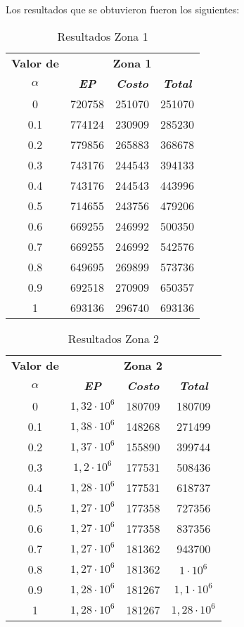 \documentclass[conference]{IEEEtran}
\begin{document}
Los resultados que se obtuvieron fueron los siguientes:
\begin{table}[H]
\caption{Resultados Zona 1}
\begin{center}
\begin{tabular}{|c|c|c|c|}
\hline
\textbf{Valor de}&\multicolumn{3}{|c|}{\textbf{Zona 1}} \\
\cline{2-4} 
\textbf{$\alpha$} & \textbf{\textit{EP}}& \textbf{\textit{Costo}}& \textbf{\textit{Total}} \\
\hline
0&720758&251070&251070\\ \hline
0.1&774124&230909&285230\\ \hline
0.2&779856&265883&368678\\ \hline
0.3&743176&244543&394133\\ \hline
0.4&743176&244543&443996\\ \hline
0.5&714655&243756&479206\\ \hline
0.6&669255&246992&500350\\ \hline
0.7&669255&246992&542576\\ \hline
0.8&649695&269899&573736\\ \hline
0.9&692518&270909&650357\\ \hline
1&693136&296740&693136\\ \hline
\end{tabular}
\label{tab1}
\end{center}
\end{table}

\begin{table}[H]
\caption{Resultados Zona 2}
\begin{center}
\begin{tabular}{|c|c|c|c|}
\hline
\textbf{Valor de}&\multicolumn{3}{|c|}{\textbf{Zona 2}} \\
\cline{2-4} 
\textbf{$\alpha$} & \textbf{\textit{EP}}& \textbf{\textit{Costo}}& \textbf{\textit{Total}} \\
\hline
0&$1,32\cdot10^6$&180709&180709\\ \hline
0.1&$1,38\cdot10^6$&148268&271499\\ \hline
0.2&$1,37\cdot10^6$&155890&399744\\ \hline
0.3&$1,2\cdot10^6$&177531&508436\\ \hline
0.4&$1,28\cdot10^6$&177531&618737\\ \hline
0.5&$1,27\cdot10^6$&177358&727356\\ \hline
0.6&$1,27\cdot10^6$&177358&837356\\ \hline
0.7&$1,27\cdot10^6$&181362&943700\\ \hline
0.8&$1,27\cdot10^6$&181362&$1\cdot10^6$\\ \hline
0.9&$1,28\cdot10^6$&181267&$1,1\cdot10^6$\\ \hline
1&$1,28\cdot10^6$&181267&$1,28\cdot10^6$\\ \hline
\end{tabular}
\label{tab1}
\end{center}
\end{table}
\end{document}
